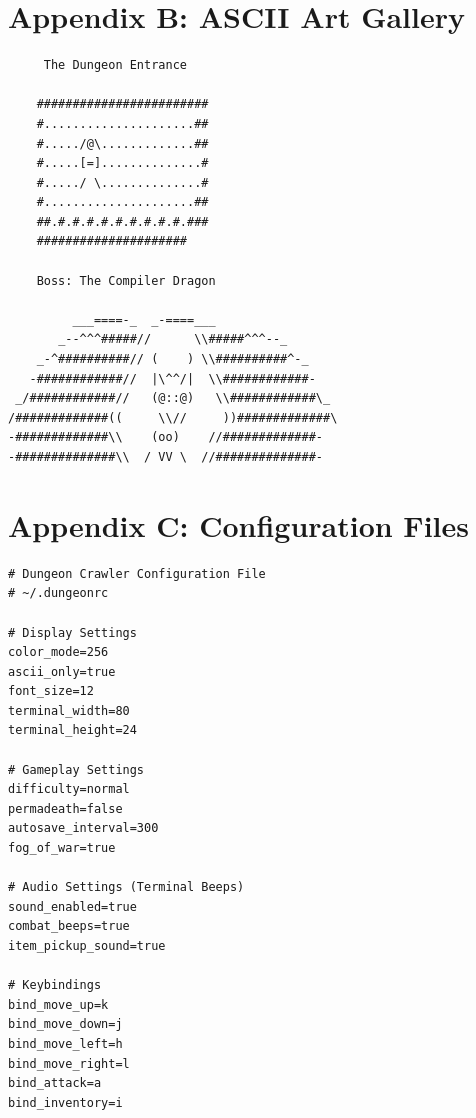 \documentclass[11pt,a4paper]{book}
\begin{document}
\section{Appendix B: ASCII Art Gallery}

\begin{verbatim}
     The Dungeon Entrance
    
    ########################
    #.....................##
    #...../@\.............##
    #.....[=]..............#
    #...../ \..............#
    #.....................##
    ##.#.#.#.#.#.#.#.#.#.###
    #####################
    
    Boss: The Compiler Dragon
    
         ___====-_  _-====___
       _--^^^#####//      \\#####^^^--_
    _-^##########// (    ) \\##########^-_
   -############//  |\^^/|  \\############-
 _/############//   (@::@)   \\############\_
/#############((     \\//     ))#############\
-#############\\    (oo)    //#############-
-##############\\  / VV \  //##############-
\end{verbatim}

\section{Appendix C: Configuration Files}

\begin{lorebox}
\begin{verbatim}
# Dungeon Crawler Configuration File
# ~/.dungeonrc

# Display Settings
color_mode=256
ascii_only=true
font_size=12
terminal_width=80
terminal_height=24

# Gameplay Settings  
difficulty=normal
permadeath=false
autosave_interval=300
fog_of_war=true

# Audio Settings (Terminal Beeps)
sound_enabled=true
combat_beeps=true
item_pickup_sound=true

# Keybindings
bind_move_up=k
bind_move_down=j
bind_move_left=h
bind_move_right=l
bind_attack=a
bind_inventory=i
\end{verbatim}
\end{lorebox}

\backmatter
\end{document}
